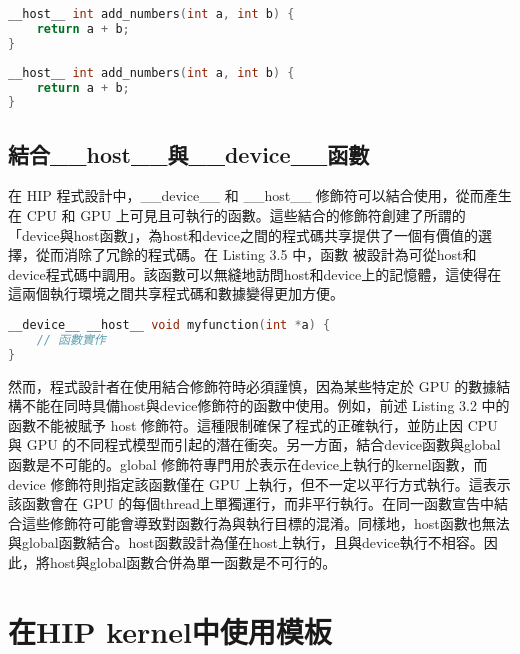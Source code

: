 \begin{lstlisting}[language=C, caption={在HIP kernel中使用\_\_host\_\_函數}, label={3rd:example}]
__host__ int add_numbers(int a, int b) {
    return a + b;
}
\end{lstlisting}

\begin{lstlisting}[language=C, caption={在HIP kernel中使用預設函數}, label={4th:example}]
__host__ int add_numbers(int a, int b) {
    return a + b;
}
\end{lstlisting}

\subsection{結合\_\_host\_\_與\_\_device\_\_函數}

在 HIP 程式設計中，\_\_device\_\_ 和 \_\_host\_\_ 修飾符可以結合使用，從而產生在 CPU 和 GPU 上可見且可執行的函數。這些結合的修飾符創建了所謂的「device與host函數」，為host和device之間的程式碼共享提供了一個有價值的選擇，從而消除了冗餘的程式碼。在 Listing 3.5 中，函數  被設計為可從host和device程式碼中調用。該函數可以無縫地訪問host和device上的記憶體，這使得在這兩個執行環境之間共享程式碼和數據變得更加方便。

\begin{lstlisting}[language=C, caption={在HIP kernel中結合\code{\_\_host\_\_}與\code{\_\_device\_\_}函數}, label={5th:example}]
__device__ __host__ void myfunction(int *a) {
    // 函數實作
}
\end{lstlisting}

然而，程式設計者在使用結合修飾符時必須謹慎，因為某些特定於 GPU 的數據結構不能在同時具備host與device修飾符的函數中使用。例如，前述 Listing 3.2 中的  函數不能被賦予 host 修飾符。這種限制確保了程式的正確執行，並防止因 CPU 與 GPU 的不同程式模型而引起的潛在衝突。另一方面，結合device函數與global函數是不可能的。global 修飾符專門用於表示在device上執行的kernel函數，而 device 修飾符則指定該函數僅在 GPU 上執行，但不一定以平行方式執行。這表示該函數會在 GPU 的每個thread上單獨運行，而非平行執行。在同一函數宣告中結合這些修飾符可能會導致對函數行為與執行目標的混淆。同樣地，host函數也無法與global函數結合。host函數設計為僅在host上執行，且與device執行不相容。因此，將host與global函數合併為單一函數是不可行的。

\section{在HIP kernel中使用模板}

